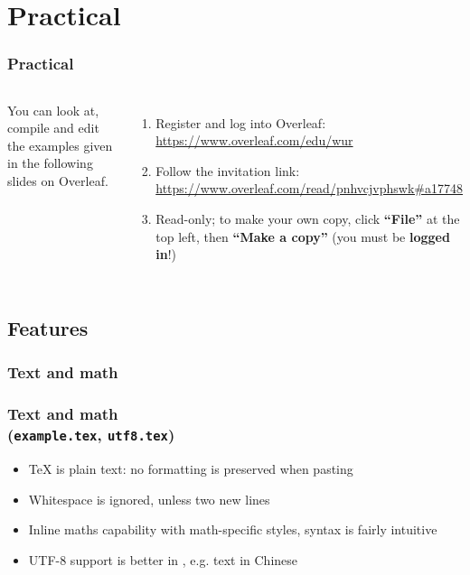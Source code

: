 \documentclass[colorlinks]{beamer} %
\begin{document}
  \section{Practical}
  \begin{frame}
    \frametitle{Practical}
    \begin{columns}
      You can look at, compile and edit the examples given in the following slides on Overleaf.
      \begin{enumerate}
      \item Register and log into Overleaf: \href{https://www.overleaf.com/edu/wur}{https://www.overleaf.com/edu/wur}
      \item Follow the invitation link: {\scriptsize \href{https://www.overleaf.com/read/pnhvcjvphswk\#a17748}{https://www.overleaf.com/read/pnhvcjvphswk\#a17748}}
      \item Read-only; to make your own copy, click \textbf{``File''} at the top left, then \textbf{``Make a copy''} (you must be \textbf{logged in}!)
      \end{enumerate}
    \end{columns}
  \end{frame}

  
  \subsection{Features}
  \subsubsection{Text and math}
  \begin{frame}
    \frametitle{Text and math \\ (\texttt{example.tex}, \texttt{utf8.tex})}
    \begin{itemize}
     \item \TeX{} is plain text: no formatting is preserved when pasting
     \item Whitespace is ignored, unless two new lines
     \item Inline maths capability with math-specific styles, syntax is fairly intuitive
     \item UTF-8 support is better in , e.g. text in Chinese
    \end{itemize}
  \end{frame}
  
\end{document}
